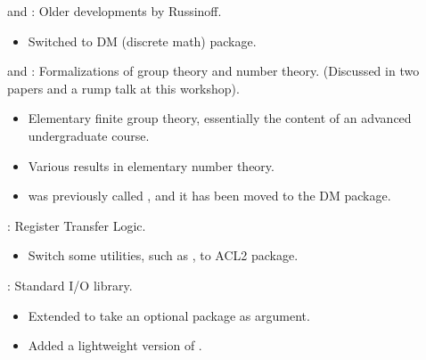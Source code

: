 
\begin{frame}

\implibtitle

 and :
Older developments by Russinoff.
\begin{itemize}
\item Switched to DM (discrete math) package.
\end{itemize}

\end{frame}


\begin{frame}

\implibtitle

 and :
Formalizations of group theory and number theory.
(Discussed in two papers and a rump talk at this workshop).
\begin{itemize}
\item Elementary finite group theory,
  essentially the content of an advanced undergraduate course.
\item Various results in elementary number theory.
\item {} was previously called
  , and it has been moved to the DM
  package.
\end{itemize}

\end{frame}


\begin{frame}

\implibtitle

:
Register Transfer Logic.
\begin{itemize}
\item Switch some utilities, such as , to ACL2 package.
\end{itemize}

\end{frame}


\begin{frame}

\implibtitle

:
Standard I/O library.
\begin{itemize}
\item Extended 
  to take an optional package as argument.
\item Added a lightweight version of .
\end{itemize}

\end{frame}

